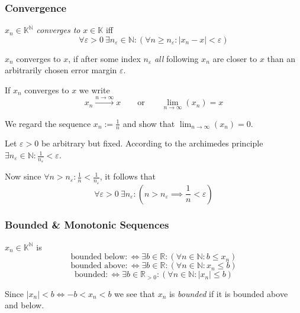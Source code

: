 \subsubsection{Convergence}
\begin{definition}\label{def:conv_seq}
   \(x_n \in \mathbb{K}^\mathbb{N}\) \emph{converges to} \(x \in \mathbb{K}\) iff
   \[\forall \varepsilon > 0~\exists n_\varepsilon \in \mathbb{N}: (\forall n \geq n_\varepsilon: |x_n - x| < \varepsilon)\]
\end{definition}
\begin{remark}[Intuition]
   \(x_n\) converges to \(x\), if after some index \(n_\varepsilon\) \emph{all} following \(x_n\) are closer to \(x\) than an arbitrarily chosen error margin \(\varepsilon\).
\end{remark}
\begin{remark}[Notation]
   If \(x_n\) converges to \(x\) we write
   \[x_n \xrightarrow{n \to \infty} x \qquad\text{or}\qquad \lim_{n \to \infty}(x_n) = x\]
\end{remark}
\begin{example}
   We regard the sequence \(x_n := \frac{1}{n}\) and show that \(\lim_{n \to \infty}(x_n) = 0\).

   Let \(\varepsilon > 0\) be arbitrary but fixed.
   According to the archimedes principle \(\exists n_\varepsilon \in \mathbb{N}: \frac{1}{n_\varepsilon} < \varepsilon\).

   Now since \(\forall n > n_\varepsilon: \frac{1}{n} < \frac{1}{n_\varepsilon}\), it follows that
   \[\forall \varepsilon > 0~\exists n_\varepsilon: \left(n > n_\varepsilon \implies \frac{1}{n} < \varepsilon\right)\]

   \begin{center}
      
   \end{center}
\end{example}

\subsubsection{Bounded \& Monotonic Sequences}
\begin{definition}
   \(x_n \in \mathbb{K}^\mathbb{N}\) is
   \[\text{bounded below} :\iff \exists b \in \mathbb{R}: (\forall n \in \mathbb{N}: b \leq x_n)\]
   \[\text{bounded above} :\iff \exists b \in \mathbb{R}: (\forall n \in \mathbb{N}: x_n \leq b)\]
   \[\text{bounded} :\iff \exists b \in \mathbb{R}_{>0}: (\forall n \in \mathbb{N}: |x_n| \leq b)\]
\end{definition}
\begin{remark}
   Since \(\lvert x_n \rvert < b \iff -b < x_n < b\) we see that \(x_n\) is \emph{bounded} if it is bounded above and below.
\end{remark}

